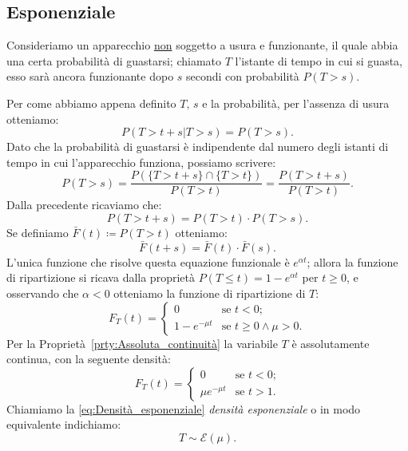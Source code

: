         \subsection{Esponenziale}\label{sec:Densità_Esponenziale}
            \begin{defn}
                Consideriamo un apparecchio \underline{non} soggetto a usura e funzionante, il quale abbia una certa probabilità di guastarsi; chiamato $T$ l'istante di tempo in cui si guasta, esso sarà ancora funzionante dopo $s$ secondi con probabilità $P(T > s)$.

                Per come abbiamo appena definito $T,\,s$ e la probabilità, per l'assenza di usura otteniamo: \[
                    P(T > t + s | T > s) = P(T > s)
                .\] Dato che la probabilità di guastarsi è indipendente dal numero degli istanti di tempo in cui l'apparecchio funziona, possiamo scrivere: \[
                P(T > s) = \frac{P(\{T > t + s\} \cap \{T > t\})}{P(T > t)} = \frac{P(T > t+s)}{P(T > t)}
                .\] Dalla precedente ricaviamo che: \[
                P(T > t + s) = P(T > t) \cdot P(T > s)
            .\] Se definiamo $\bar{F}(t) \coloneqq P(T > t)$ otteniamo: \[
                \bar{F}(t + s) = \bar{F}(t) \cdot \bar{F}(s)
            .\] L'unica funzione che risolve questa equazione funzionale è $e^{\alpha t}$; allora la funzione di ripartizione si ricava dalla proprietà $P(T \leq t) = 1 - e^{\alpha t}$ per $t \geq 0$, e osservando che $\alpha < 0$ otteniamo la funzione di ripartizione di $T$: \[
            F_T(t) = \begin{cases}
                0 & \text{se $t < 0$;} \\
                1 - e^{-\mu t} & \text{se $t \geq 0 \land \mu > 0$.}
            \end{cases}
            \] Per la Proprietà~\ref{prty:Assoluta_continuità} la variabile $T$ è assolutamente continua, con la seguente densità:
            \begin{equation}\label{eq:Densità_esponenziale} 
                F_T(t) = \begin{cases}
                    0 & \text{se $t < 0$;} \\
                    \mu e^{-\mu t} & \text{se $t > 1$.}
                \end{cases}
           \end{equation}
            Chiamiamo la \eqref{eq:Densità_esponenziale} \emph{densità esponenziale} o in modo equivalente indichiamo: \[
                T \sim \mathcal{E}(\mu)
            .\]
            \end{defn}
